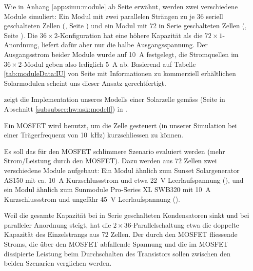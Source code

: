 Wie  in   Anhang  \ref{app:simu:module}  ab   Seite  \pageref{app:simu:module}
erw\"ahnt,     werden     zwei      verschiedene     Module     simuliert: Ein
Modul    mit    zwei    parallelen     Str\"angen    zu    je    36    seriell
geschalteten    Zellen     (,    Seite
\pageref{fig:ltspice:module:cellBased:36x2})    und   ein    Modul   mit    72
in   Serie   geschalteten  Zellen   (,
Seite     \pageref{fig:ltspice:module:cellBased:72x1}). Die     $36     \times
2$-Konfiguration   hat   eine  h\"ohere   Kapazit\"at   als
die   $72  \times   1$-Anordnung,   liefert  daf\"ur   aber   nur  die   halbe
Ausgangsspannung. Der Ausgangsstrom  beider Module wurde  auf \SI{10}{\ampere}
festgelegt,  die Stromquellen  im  $36 \times  2$-Modul  geben also  lediglich
\SI{5}{\ampere}  ab. Basierend auf  Tabelle \ref{tab:moduleData:IU}  von Seite
\pageref{tab:moduleData:IU}  mit Informationen  zu kommerziell  erh\"altlichen
Solarmodulen scheint uns dieser Ansatz gerechtfertigt.

   zeigt   die  Implementation   unseres   Modells
einer     Solarzelle      gem\"ass          (Seite
\pageref{fig:circuit:solarCell} in Abschnitt \ref{subsubsec:hw:ask:modell}) in
.

Ein MOSFET  wird benutzt, um  die Zelle  gesteuert (in unserer  Simulation bei
einer Tr\"agerfrequenz von \SI{10}{\kilo\hertz}) kurzschliessen zu k\"onnen.

Es    soll   das    f\"ur   den    MOSFET   schlimmere    Szenario   evaluiert
werden   (mehr    Strom/Leistung   durch    den   MOSFET). Dazu
werden   aus  72   Zellen  zwei   verschiedene  Module   aufgebaut: Ein  Modul
\"ahnlich    zum    Sunset   Solargenerator    AS150    \cite{ref:solar:as150}
mit    ca. \SI{10}{\ampere}   Kurzschlussstrom    und   etwa    \SI{22}{\volt}
Leerlaufspannung  (),  und  ein  Modul
\"ahnlich  zum Sunmodule  Pro-Series  XL SWB320  \cite{ref:solar:sunmodulePro}
mit   \SI{10}{\ampere}   Kurzschlussstrom    und   ungef\"ahr   \SI{45}{\volt}
Leerlaufspannung ().

Weil die gesamte Kapazit\"at bei in Serie geschalteten Kondensatoren sinkt und
bei  paralleler  Anordnung steigt,  hat  die  $2 \times  36$-Parallelschaltung
 etwa die doppelte Kapazit\"at des Einzelstrangs
aus 72 Zellen. Der  durch den MOSFET fliessende Stroms, die  \"uber den MOSFET
abfallende Spannung und die im  MOSFET dissipierte Leistung beim Durchschalten
des Transistors sollen zwischen den beiden Szenarien verglichen werden.

